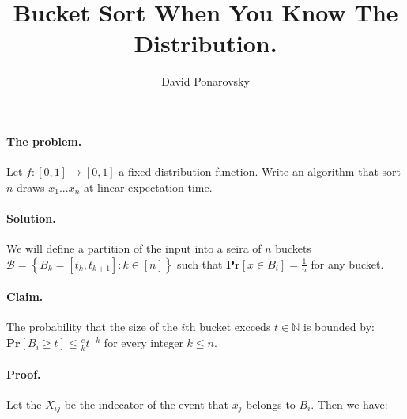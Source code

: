 \documentclass{article}
\newcommand{\prb}[1]{ \mathbf{Pr} \left[ {#1} \right]}
\newcommand{\expp}[1]{ \mathbf{E} \left[ {#1} \right]}
\newcommand{\xij} { X_{ij} }
\begin{document}
\title{Bucket Sort When You Know The Distribution.} 
\author{David Ponarovsky}
\maketitle
{} 
\begin{multicols*}{2}

  \paragraph{The problem.} Let $f: [0,1] \rightarrow [0,1]$ a fixed distribution function. Write an algorithm that sort $n$ draws $x_1 ... x_{n}$ at linear expectation time.  
  \paragraph{Solution.} We will define a partition of the input into a seira of $n$ buckets $\mathcal{B} = \left\{ B_{k} = [t_{k}, t_{k+1} ] : k \in [n]  \right\}$ such that $ \prb{ x \in B_{i}} = \frac{1}{n}$ for any bucket. 
  \paragraph{Claim.} The probability that the size of the $i$th bucket excceds $t \in \mathbb{N}$ is bounded by: $\prb{ B_{i} \ge t}  \le \frac{e}{k}t^{-k}$ for every integer $k \le n$.
  \paragraph{Proof.} Let the $\xij$ be the indecator of the event that $x_{j}$ belongs to $B_i$. Then we have:
 

\end{multicols*}
\end{document}
